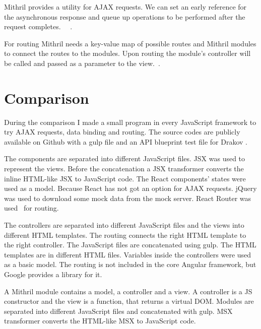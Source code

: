 Mithril provides a utility for AJAX requests. We can set an early reference for the asynchronous response and queue up operations to be performed after the request completes.  ~\cite{Mithril-webservice}~\cite{Mithril-request}.


For routing Mithril needs a key-value map of possible routes and Mithril modules to connect the routes to the modules. Upon routing the module's controller will be called and passed as a parameter to the view.~\cite{Mithril-routing}.

\section{Comparison}

During the comparison I made a small program in every JavaScript framework to try AJAX requests, data binding and routing. The source codes are publicly available on Github with a gulp file  and an API blueprint test file for Drakov .

The components are separated into different JavaScript files. JSX was used to represent the views. Before the concatenation a JSX transformer converts the inline HTML-like JSX to JavaScript code. The React components' states were used as a model. Because React has not got an option for AJAX requests. jQuery was used to download some mock data from the mock server. React Router was used~\cite{React-router} for routing. 


The controllers are separated into different JavaScript files and the views into different HTML templates. The routing connects the right HTML template to the right controller. The JavaScript files are concatenated using gulp. The HTML templates are in different HTML files. Variables inside the controllers were used as a basic model. The routing is not included in the core Angular framework, but Google provides a library for it.


A Mithril module contains a model, a controller and a view. A controller is a JS constructor and the view is a function, that returns a virtual DOM. Modules are separated into different JavaScript files and concatenated with gulp. MSX transformer converts the HTML-like MSX to JavaScript code. 


